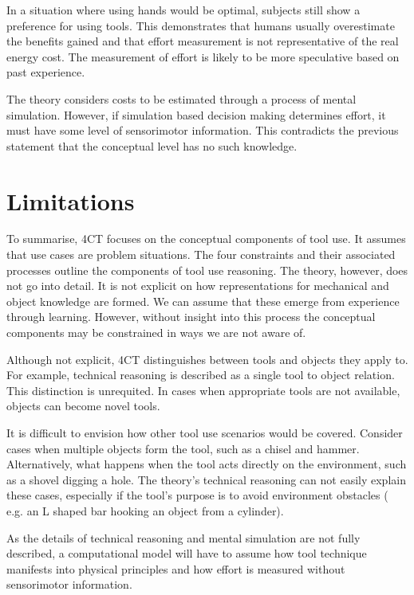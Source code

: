 \documentclass[11]{article}
\begin{document}
In a situation where using hands would be optimal, subjects still show a preference for using tools\cite{osiurak2014}. This demonstrates that humans usually overestimate the benefits gained and that effort measurement is not representative of the real energy cost. The measurement of effort is likely to be more speculative based on past experience. 

The theory considers costs to be estimated through a process of mental simulation. However, if simulation based decision making determines effort, it must have some level of sensorimotor information. This contradicts the previous statement that the conceptual level has no such knowledge.

\section{Limitations}
To summarise, 4CT focuses on the conceptual components of tool use. It assumes that use cases are problem situations\cite{osiurak2014}. The four constraints and their associated processes outline the components of tool use reasoning. The theory, however, does not go into detail. It is not explicit on how representations for mechanical and object knowledge are formed. We can assume that these emerge from experience through learning. However, without insight into this process the conceptual components may be constrained in ways we are not aware of.

Although not explicit, 4CT distinguishes between tools and objects they apply to. For example, technical reasoning is described as a single tool to object relation. This distinction is unrequited. In cases when appropriate tools are not available, objects can become novel tools.

It is difficult to envision how other tool use scenarios would be covered. Consider cases when multiple objects form the tool, such as a chisel and hammer. Alternatively, what happens when the tool acts directly on the environment, such as a shovel digging a hole. The theory's technical reasoning can not easily explain these cases, especially if the tool's purpose is to avoid environment obstacles ( e.g. an L shaped bar hooking an object from a cylinder).

As the details of technical reasoning and mental simulation are not fully described, a computational model will have to assume how tool technique manifests into physical principles and how effort is measured without sensorimotor information. 
\end{document}
